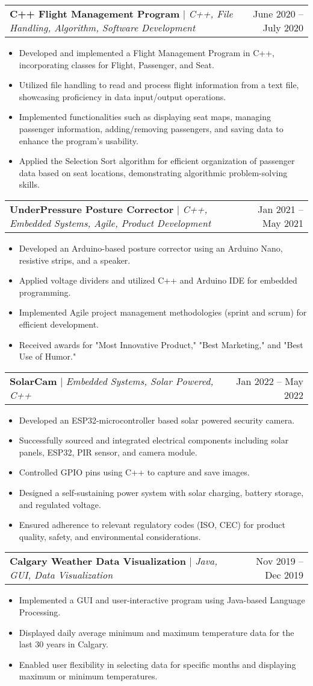 \documentclass[A4,10pt]{article}
\makeatletter
\newcommand{\resumeItem}[1]{
  \item\small{
    {#1 \vspace{-2pt}}
  }
}
\newcommand{\resumeProjectHeading}[2]{
    \item
    \begin{tabular*}{0.97\textwidth}{l@{\extracolsep{\fill}}r}
      \small#1 & #2 \\
    \end{tabular*}\vspace{-7pt}
}
\newcommand{\resumeItemListStart}{\begin{itemize}}
\newcommand{\resumeItemListEnd}{\end{itemize}\vspace{-5pt}}
\makeatother
\begin{document}
        \resumeProjectHeading
        {\textbf{C++ Flight Management Program} $|$ \emph{C++, File Handling, Algorithm, Software Development}}{June 2020 -- July 2020}
        \resumeItemListStart
          \resumeItem{Developed and implemented a Flight Management Program in C++, incorporating classes for Flight, Passenger, and Seat.}
          \resumeItem{Utilized file handling to read and process flight information from a text file, showcasing proficiency in data input/output operations.}
          \resumeItem{Implemented functionalities such as displaying seat maps, managing passenger information, adding/removing passengers, and saving data to enhance the program's usability.}
          \resumeItem{Applied the Selection Sort algorithm for efficient organization of passenger data based on seat locations, demonstrating algorithmic problem-solving skills.}
        \resumeItemListEnd
  
        \resumeProjectHeading
        {\textbf{UnderPressure Posture Corrector} $|$ \emph{C++, Embedded Systems, Agile, Product Development}}{Jan 2021 -- May 2021}
        \resumeItemListStart
          \resumeItem{Developed an Arduino-based posture corrector using an Arduino Nano, resistive strips, and a speaker.}
          \resumeItem{Applied voltage dividers and utilized C++ and Arduino IDE for embedded programming.}
          \resumeItem{Implemented Agile project management methodologies (sprint and scrum) for efficient development.}
          \resumeItem{Received awards for "Most Innovative Product," "Best Marketing," and "Best Use of Humor."}
        \resumeItemListEnd
  
        \resumeProjectHeading
        {\textbf{SolarCam} $|$ \emph{Embedded Systems, Solar Powered, C++}}{Jan 2022 -- May 2022}
        \resumeItemListStart
          \resumeItem{Developed an ESP32-microcontroller based solar powered security camera.}
          \resumeItem{Successfully sourced and integrated electrical components including solar panels, ESP32, PIR sensor, and camera module.}
          \resumeItem{Controlled GPIO pins using C++ to capture and save images.}
          \resumeItem{Designed a self-sustaining power system with solar charging, battery storage, and regulated voltage.}
          \resumeItem{Ensured adherence to relevant regulatory codes (ISO, CEC) for product quality, safety, and environmental considerations.}
        \resumeItemListEnd
  
        \resumeProjectHeading
        {\textbf{Calgary Weather Data Visualization} $|$ \emph{Java, GUI, Data Visualization}}{Nov 2019 -- Dec 2019}
        \resumeItemListStart
          \resumeItem{Implemented a GUI and user-interactive program using Java-based Language Processing.}
          \resumeItem{Displayed daily average minimum and maximum temperature data for the last 30 years in Calgary.}
          \resumeItem{Enabled user flexibility in selecting data for specific months and displaying maximum or minimum temperatures.}
        \resumeItemListEnd
  
\end{document}
